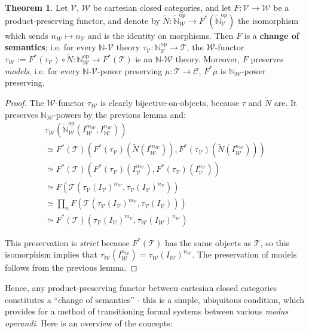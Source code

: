 \documentclass[a4paper,UKenglish]{article}
\theoremstyle{definition}
\newtheorem{theorem}{Theorem}
\newcommand{\op}{\mathrm{op}}
\newcommand{\NN}{\mathbb{N}}
\newcommand{\V}{\mathscr{V}}
\newcommand{\W}{\mathscr{W}}
\newcommand{\C}{\mathscr{C}}
\newcommand{\T}{\mathscr{T}}
\begin{document}
\begin{theorem}
	Let $\V$, $\W$ be cartesian closed categories, and let $F: \V \to \W$ be a product-preserving functor, and denote by $\tilde{N}: \tilde{\NN}_\W^\op \to F^*(\tilde{\NN}_\V^\op)$ the isomorphism which sends $n_\W \mapsto n_\V$ and is the identity on morphisms. Then $F$ is a \textbf{change of semantics}; i.e. for every $\NN$-$\V$ theory $\tau_\V: \NN_\V^\op \to \T$, the $\W$-functor $\tau_\W := F^*(\tau_\V) \circ \tilde{N}: \NN_\W^\op \to F^*(\T)$ is an $\NN$-$\W$ theory. Moreover, $F$ preserves \textit{models}, i.e. for every $\NN$-$\V$-power preserving $\mu:\T \to \C$, $F^*\mu$ is $\NN_\W$-power preserving.
\end{theorem}
\begin{proof}
	The $\W$-functor $\tau_\W$ is clearly bijective-on-objects, because $\tau$ and $\tilde{N}$ are. It preserves $\NN_\W$-powers by the previous lemma and:
\[\begin{array}{l}
	\tau_\W(\tilde{\NN}_\W^\op(I_\W^{m_\W},I_\W^{n_\W}))\\
	\simeq F^*(\T)(F^*(\tau_\V)(\tilde{N}(I_\W^{m_\W})), F^*(\tau_\V)(\tilde{N}(I_\W^{n_\W})))\\
	\simeq F^*(\T)(F^*(\tau_\V)(I_\V^{m_\V}), F^*(\tau_\V)(I_\V^{n_\V}))\\
	\simeq F(\T(\tau_\V(I_\V)^{m_\V}, \tau_\V(I_\V)^{n_\V}))\\
	\simeq \prod_n F(\T(\tau_\V(I_\V)^{m_\V}, \tau_\V(I_\V)))\\
	\simeq F^*(\T)(\tau_\V(I_\V)^{m_\V}, \tau_\W(I_\W)^{n_\W})
\end{array}\]

This preservation is \textit{strict} because $F^*(\T)$ has the same objects as $\T$, so this isomorphism implies that $\tau_\W(I_\W^{n_\W}) = \tau_\W(I_\W)^{n_\W}$. The preservation of models follows from the previous lemma.
\end{proof}

Hence, any product-preserving functor between cartesian closed categories constitutes a ``change of semantics'' - this is a simple, ubiquitous condition, which provides for a method of transitioning formal systems between various \textit{modus operandi}. Here is an overview of the concepts:

\end{document}
